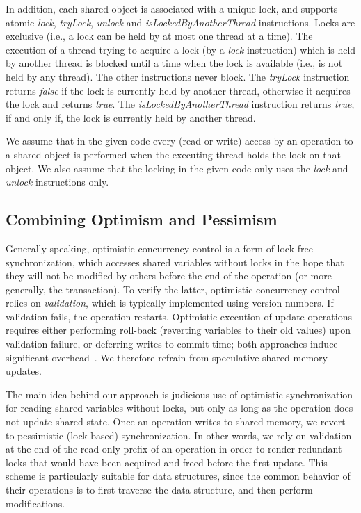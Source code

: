 In addition, each shared object is associated with a unique lock, and supports 
atomic \emph{lock}, \emph{tryLock}, \emph{unlock} and \emph{isLockedByAnotherThread} instructions.
Locks are exclusive (i.e., a lock can be held by at most one thread at a time).
The execution of a thread
trying to acquire a lock (by a \emph{lock} instruction) which is
held by another thread is blocked until a time when the
lock is available (i.e., is not held by any thread).
The other instructions never block.
The \emph{tryLock} instruction returns \emph{false} if the lock is currently held by another thread, otherwise it acquires the lock and returns \emph{true}.
The \emph{isLockedByAnotherThread} instruction returns \emph{true}, if and only if, the lock is currently held by another thread.

We assume that in the given code every (read
or write) access by an operation to a shared object is performed when the
executing thread holds the lock on that object.
We also assume that the locking in the given code only uses the \emph{lock} and \emph{unlock} instructions only.

\subsection{Combining Optimism and Pessimism}\label{ssec:overview}

Generally speaking, optimistic concurrency control is a form of lock-free synchronization, which accesses shared variables without locks in the hope that they will not be modified by others before the end of the operation (or more generally, the transaction). To verify the latter, optimistic concurrency control relies on \emph{validation}, which is typically implemented using version numbers. If validation fails, the operation restarts. Optimistic execution of update operations requires either performing roll-back (reverting variables to their old values) upon validation failure, or deferring writes to commit time; both approaches induce significant overhead~\cite{Cascaval:2008}. We therefore refrain from speculative shared memory updates.



The main idea behind our approach is judicious use of optimistic synchronization for reading
shared variables without locks, but only as long as the operation does not update shared state. Once an operation
writes to shared memory, we revert to pessimistic (lock-based) synchronization. In
other words, we rely on validation at the end of the read-only prefix of an operation in order to render redundant
locks that would have been acquired and freed before the first update.
This scheme is particularly suitable for data structures,
since the common behavior of their operations
is to first traverse the data structure, and then
perform modifications.

